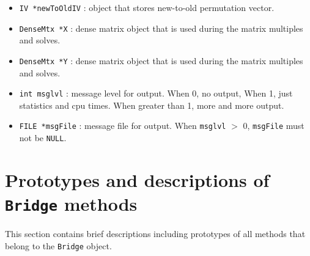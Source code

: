 \begin{itemize}
\item
{\tt IV *newToOldIV} : object that stores new-to-old permutation vector.
\item
{\tt DenseMtx *X} : dense matrix object that is used during the matrix
multiples and solves.
\item
{\tt DenseMtx *Y} : dense matrix object that is used during the matrix
multiples and solves.
\item
{\tt int msglvl} : message level for output.
When 0, no output, When 1, just statistics and cpu times.
When greater than 1, more and more output.
\item
{\tt FILE *msgFile} : message file for output.
When \texttt{msglvl} $>$ 0, \texttt{msgFile} must not be \texttt{NULL}.
\end{itemize}
\par
\section{Prototypes and descriptions of \texttt{Bridge} methods}
\label{section:Bridge:proto}
\par
This section contains brief descriptions including prototypes
of all methods that belong to the {\tt Bridge} object.
\par
